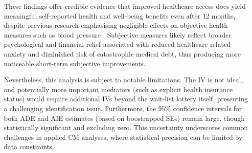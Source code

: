 These findings offer credible evidence that improved healthcare access does yield meaningful self-reported health and well-being benefits even after 12 months, despite previous research emphasising negligible effects on objective health measures such as blood pressure \citep{baicker2013oregon}.
Subjective measures likely reflect broader psychological and financial relief associated with reduced healthcare-related anxiety and diminished risk of catastrophic medical debt, thus producing more noticeable short-term subjective improvements.

Nevertheless, this analysis is subject to notable limitations.
The IV is not ideal, and potentially more important mediators (such as explicit health insurance status) would require additional IVs beyond the wait-list lottery itself, presenting a challenging identification issue.
Furthermore, the 95\% confidence intervals for both ADE and AIE estimates (based on boostrapped SEs) remain large, though statistically significant and excluding zero.
This uncertainty underscores common challenges in applied CM analyses, where statistical precision can be limited by data constraints.
